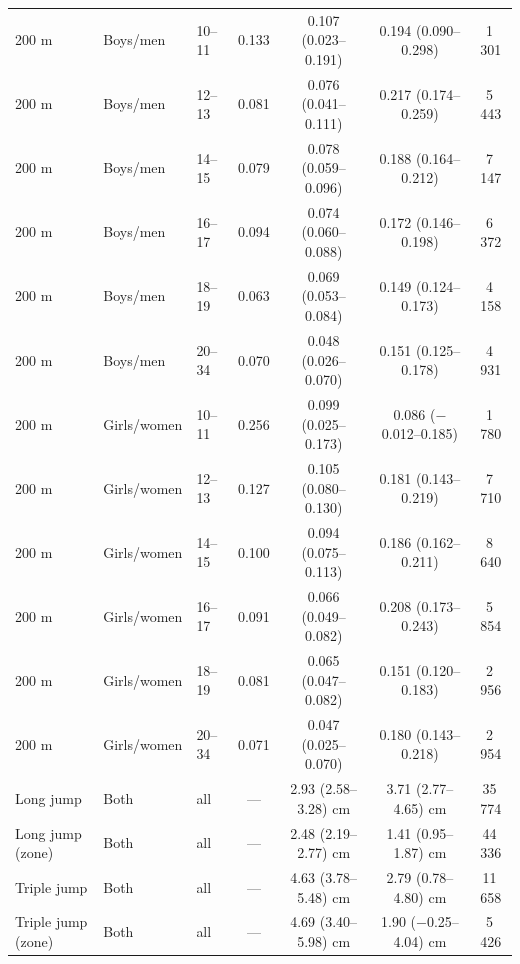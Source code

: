 \begin{tabular}{lllcccc}
200 m & Boys/men & 10--11 & 0.133 & 0.107 (0.023--0.191) & 0.194 (0.090--0.298) & 1\,301 \\
200 m & Boys/men & 12--13 & 0.081 & 0.076 (0.041--0.111) & 0.217 (0.174--0.259) & 5\,443 \\
200 m & Boys/men & 14--15 & 0.079 & 0.078 (0.059--0.096) & 0.188 (0.164--0.212) & 7\,147 \\
200 m & Boys/men & 16--17 & 0.094 & 0.074 (0.060--0.088) & 0.172 (0.146--0.198) & 6\,372 \\
200 m & Boys/men & 18--19 & 0.063 & 0.069 (0.053--0.084) & 0.149 (0.124--0.173) & 4\,158 \\
200 m & Boys/men & 20--34 & 0.070 & 0.048 (0.026--0.070) & 0.151 (0.125--0.178) & 4\,931 \\
200 m & Girls/women & 10--11 & 0.256 & 0.099 (0.025--0.173) & 0.086 ($-$0.012--0.185) & 1\,780 \\
200 m & Girls/women & 12--13 & 0.127 & 0.105 (0.080--0.130) & 0.181 (0.143--0.219) & 7\,710 \\
200 m & Girls/women & 14--15 & 0.100 & 0.094 (0.075--0.113) & 0.186 (0.162--0.211) & 8\,640 \\
200 m & Girls/women & 16--17 & 0.091 & 0.066 (0.049--0.082) & 0.208 (0.173--0.243) & 5\,854 \\
200 m & Girls/women & 18--19 & 0.081 & 0.065 (0.047--0.082) & 0.151 (0.120--0.183) & 2\,956 \\
200 m & Girls/women & 20--34 & 0.071 & 0.047 (0.025--0.070) & 0.180 (0.143--0.218) & 2\,954 \\
Long jump & Both & all & --- & 2.93 (2.58--3.28) cm & 3.71 (2.77--4.65) cm & 35\,774 \\
Long jump (zone) & Both & all & --- & 2.48 (2.19--2.77) cm & 1.41 (0.95--1.87) cm & 44\,336 \\
Triple jump & Both & all & --- & 4.63 (3.78--5.48) cm & 2.79 (0.78--4.80) cm & 11\,658 \\
Triple jump (zone) & Both & all & --- & 4.69 (3.40--5.98) cm & 1.90 ($-$0.25--4.04) cm & 5\,426 \\
\bottomrule
\end{tabular}

